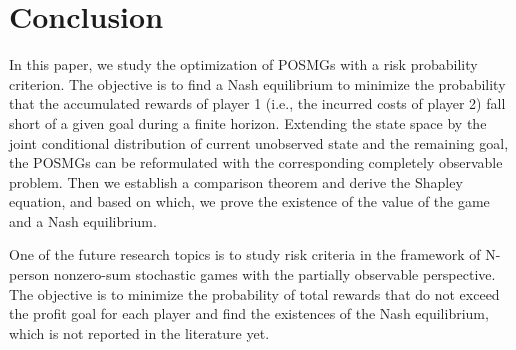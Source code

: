 \documentclass[12pt]{article}
\begin{document}
\section{Conclusion}\label{sec5}
In this paper, we study the optimization of
POSMGs with a risk probability criterion. The objective is  to find a Nash equilibrium to
minimize the probability that the accumulated rewards of player 1 (i.e., the incurred costs of player 2)  fall short of a given goal during a finite horizon. Extending the state space by the joint conditional distribution of current unobserved state and the remaining  goal, the POSMGs can be reformulated with the corresponding completely observable problem.
Then we establish a comparison theorem and derive the Shapley equation, and based on which, we prove the existence of the value of the game and a Nash equilibrium.



One of the future research topics is
to study risk criteria in   the framework of N-person nonzero-sum stochastic games with the partially observable perspective. The objective is to minimize the probability of total rewards that do not exceed the profit goal for each player and find the existences of the Nash equilibrium, which is not reported in the literature yet.
\end{document}
